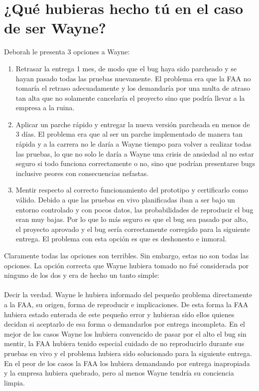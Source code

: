 \documentclass{article}
\begin{document}
\section{¿Qué hubieras hecho tú en el caso de ser Wayne?}
Deborah le presenta 3 opciones a Wayne:
\begin{enumerate}
	\item Retrasar la entrega 1 mes, de modo que el
		bug haya sido parcheado y se hayan pasado todas
		las pruebas nuevamente. El problema era que la
		FAA no tomaría el retraso adecuadamente y los
		demandaría por una multa de atraso tan alta que
		no solamente cancelaría el proyecto sino que 
		podría llevar a la empresa a la ruina.
	\item Aplicar un parche rápido y entregar la nueva versión
		parcheada en menos de 3 días. El problema era que
		al ser un parche implementado de manera tan rápida 
		y a la carrera no le daría a Wayne tiempo para 
		volver a realizar todas las pruebas, lo que 
		no solo le daría a Wayne una crisis de ansiedad al
		no estar seguro si todo funciona correctamente o no,
		sino que podrían presentarse bugs inclusive peores
		con consecuencias nefastas.
	\item Mentir respecto al correcto funcionamiento del
		prototipo y certificarlo como válido. Debido a que
		las pruebas en vivo planificadas iban a ser bajo 
		un entorno controlado y con pocos datos, las
		probabilidades de reproducir el bug eran muy bajas.
		Por lo que lo más seguro es que el bug sea pasado
		por alto, el proyecto aprovado y el bug sería 
		correctamente corregido para la siguiente entrega.
		El problema con esta opción es que es deshonesto e
		inmoral.
\end{enumerate}
Claramente todas las opciones son terribles. Sin embargo, estas
no son todas las opciones. La opción correcta que Wayne hubiera
tomado no fué considerada por ninguno de los dos y era de hecho
un tanto simple: \\\\
Decir la verdad. Wayne le hubiera informado del pequeño problema
directamente a la FAA, su origen, forma de reproducir e implicaciones.
De esta forma la FAA hubiera estado enterada de este pequeño error
y hubieran sido ellos quienes decidan si aceptarlo de esa forma
o demandarlos por entrega incompleta. En el mejor de los casos
Wayne los hubiera convencido de pasar por el alto el bug sin mentir,
la FAA hubiera tenido especial cuidado de no reproducirlo durante 
sus pruebas en vivo y el problema hubiera sido solucionado para
la siguiente entrega. En el peor de los casos la FAA los hubiera
demandando por entrega inapropiada y la empresa hubiera quebrado, 
pero al menos Wayne tendría su conciencia limpia.
\end{document}
